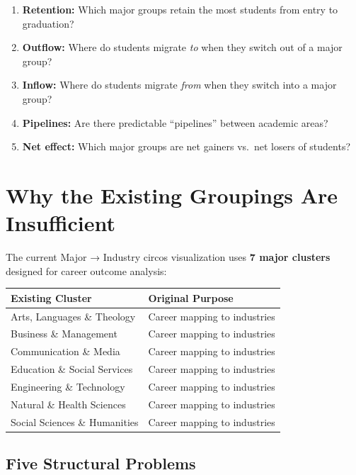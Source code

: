 \documentclass[
  11pt,
  letterpaper,
]{report}
\providecommand{\tightlist}{%
  \setlength{\itemsep}{0pt}\setlength{\parskip}{0pt}}
\begin{document}
\begin{enumerate}
\def\labelenumi{\arabic{enumi}.}
\tightlist
\item
  \textbf{Retention:} Which major groups retain the most students from
  entry to graduation?
\item
  \textbf{Outflow:} Where do students migrate \emph{to} when they switch
  out of a major group?
\item
  \textbf{Inflow:} Where do students migrate \emph{from} when they
  switch into a major group?
\item
  \textbf{Pipelines:} Are there predictable ``pipelines'' between
  academic areas?
\item
  \textbf{Net effect:} Which major groups are net gainers vs.~net losers
  of students?
\end{enumerate}

\chapter{Why the Existing Groupings Are
Insufficient}\label{why-the-existing-groupings-are-insufficient}

The current Major → Industry circos visualization uses \textbf{7 major
clusters} designed for career outcome analysis:

\begin{center}
\small
\begin{tabular}{ll}
\toprule
\textbf{Existing Cluster} & \textbf{Original Purpose} \\
\midrule
Arts, Languages \& Theology & Career mapping to industries \\
Business \& Management & Career mapping to industries \\
Communication \& Media & Career mapping to industries \\
Education \& Social Services & Career mapping to industries \\
Engineering \& Technology & Career mapping to industries \\
Natural \& Health Sciences & Career mapping to industries \\
Social Sciences \& Humanities & Career mapping to industries \\
\bottomrule
\end{tabular}
\end{center}

\section{Five Structural Problems}\label{five-structural-problems}
\end{document}
